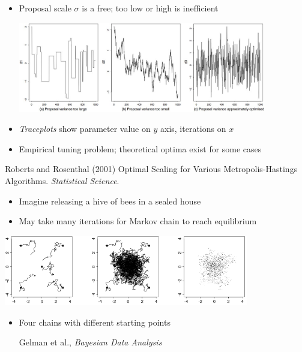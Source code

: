 \documentclass[10pt]{report}
\begin{document}
%
\begin{itemize}\small
\item Proposal scale $\sigma$ is a free; too low or high is inefficient
\begin{center}
\includegraphics[width=0.85\textwidth]{img/roberts-rosenthal-traceplots.jpg}
\end{center}
\item \emph{Traceplots} show parameter value on $y$ axis, iterations on $x$
\item Empirical tuning problem; theoretical optima exist for some
  cases
\end{itemize}
\vfill\hfill
{\tiny Roberts and Rosenthal (2001) Optimal Scaling for Various
  Metropolis-Hastings Algorithms. {\slshape Statistical Science}.}


\begin{itemize}
\item Imagine releasing a hive of bees in a sealed house
\item May take many iterations for Markov chain to reach equilibrium
\end{itemize}

\begin{center}
\includegraphics[width=0.8\textwidth]{img/bda-diffuse-converge.png}
\end{center}
\begin{itemize}
\item Four chains with different starting points
\vfill\hfill {\footnotesize Gelman et al., {\slshape Bayesian Data Analysis}}
\end{itemize}
\end{document}
